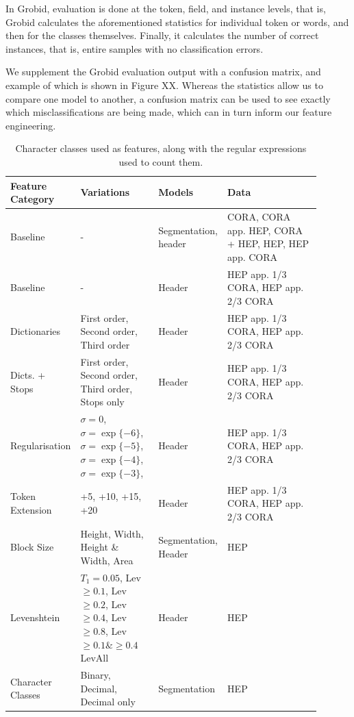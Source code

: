 In Grobid, evaluation is done at the token, field, and instance levels, that is, Grobid calculates the aforementioned statistics for individual token or words, and then for the classes themselves. Finally, it calculates the number of correct instances, that is, entire samples with no classification errors.

We supplement the Grobid evaluation output with a confusion matrix, and example of which is shown in Figure XX. Whereas the statistics allow us to compare one model to another, a confusion matrix can be used to see exactly which misclassifications are being made, which can in turn inform our feature engineering.

\begin{table}[h]
\begin{center}
\begin{tabular}{ | p{0.2\linewidth} | p{0.25\linewidth} | p{0.15\linewidth} | p{0.3\linewidth} |}
\hline
Feature Category & Variations & Models & Data\\
\hline
Baseline & - & Segmentation, header & CORA, CORA app. HEP, CORA + HEP, HEP, HEP app. CORA \\
\hline
Baseline & - & Header & HEP app. 1/3 CORA, HEP app. 2/3 CORA \\
\hline
Dictionaries & First order, Second order, Third order & Header & HEP app. 1/3 CORA, HEP app. 2/3 CORA \\
\hline
Dicts. + Stops & First order, Second order, Third order, Stops only & Header & HEP app. 1/3 CORA, HEP app. 2/3 CORA \\
\hline
Regularisation & $\sigma=0$, $\sigma=\exp\{-6\}$,$\sigma=\exp\{-5\}$,$\sigma=\exp\{-4\}$,$\sigma=\exp\{-3\}$, & Header & HEP app. 1/3 CORA, HEP app. 2/3 CORA \\
\hline
Token Extension & +5, +10, +15, +20 & Header & HEP app. 1/3 CORA, HEP app. 2/3 CORA \\
\hline
Block Size & Height, Width, Height \& Width, Area & Segmentation, Header & HEP \\
\hline
Levenshtein & $T_1 = 0.05$, Lev$\geq0.1$, Lev$\geq0.2$, Lev$\geq0.4$, Lev$\geq0.8$, Lev$\geq0.1 \& \geq0.4$ LevAll & Header & HEP \\
\hline
Character Classes & Binary, Decimal, Decimal only & Segmentation & HEP \\
\hline
\end{tabular}
\caption[Character classes used as features, along with the regular expressions used to count them.]{Character classes used as features, along with the regular expressions used to count them.}
\label{table:experiments}
\end{center}
\end{table}

